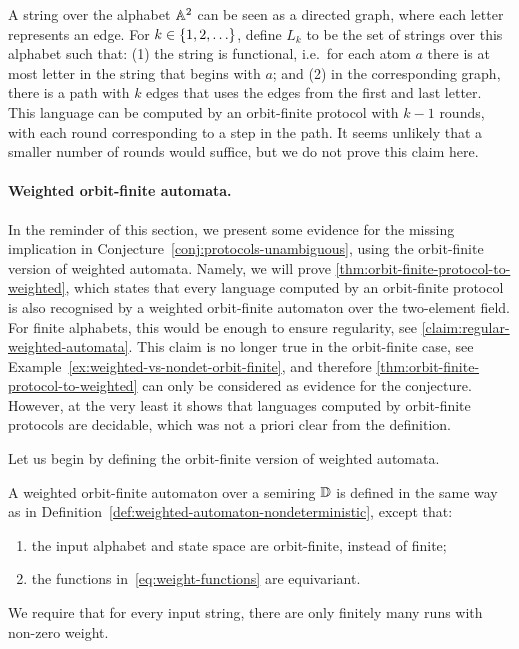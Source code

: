 \begin{myexample}
    A string over the alphabet $\mathbb A^2$ can be seen as a directed graph, where each letter represents an edge. For $k \in \{1,2,\ldots\}$, define  $L_k$ to be the set of strings over this alphabet such that: (1) the string is functional, i.e.~for each atom $a$ there is at most letter in the string that begins with $a$; and (2) in the corresponding graph, there is a path with $k$ edges that uses the edges from the first and last letter. This language can be computed by an orbit-finite protocol with $k-1$ rounds, with each round corresponding to a step in the path. It seems unlikely that a smaller number of rounds would suffice, but we do not prove this claim here. 
\end{myexample}



\paragraph*{Weighted orbit-finite automata.} In the reminder of this section, we present some evidence for the missing implication
in Conjecture~\ref{conj:protocols-unambiguous}, using the orbit-finite version of weighted automata. Namely, we will prove
\cref{thm:orbit-finite-protocol-to-weighted}, which states that every language computed by an orbit-finite protocol is also recognised by a weighted orbit-finite automaton over the two-element field.
For finite alphabets, this would be enough to ensure regularity, see \cref{claim:regular-weighted-automata}. This claim is no longer true in the orbit-finite case, see Example~\ref{ex:weighted-vs-nondet-orbit-finite}, and therefore \cref{thm:orbit-finite-protocol-to-weighted} can only be considered as evidence for the conjecture. However, at the very least it shows that languages computed by orbit-finite protocols are decidable, which was not a priori clear from the definition.

Let us begin by defining the orbit-finite version of weighted automata. 
\begin{definition}
    \label{def:weighted-orbit-finite-automata}
    A weighted orbit-finite automaton over a semiring $\mathbb D$ is defined in the same way as in Definition~\ref{def:weighted-automaton-nondeterministic}, except that:
    \begin{enumerate}
        \item the input alphabet and state space are orbit-finite, instead of finite;
        \item the functions in~\eqref{eq:weight-functions} are equivariant.
    \end{enumerate}
     We require that for every input string, there are only finitely many runs with non-zero weight.
\end{definition}


